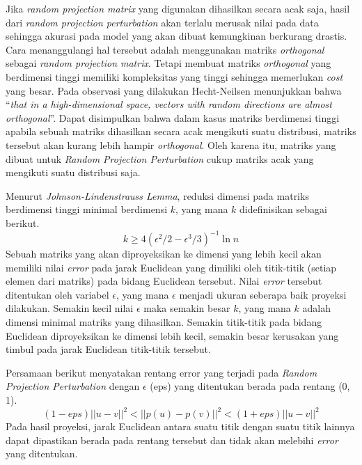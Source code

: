 \documentclass[a4paper,twoside]{article}
\begin{document}
\begin{enumerate}
		Jika \textit{random projection matrix} yang digunakan dihasilkan secara acak saja, hasil dari \textit{random projection perturbation} akan terlalu merusak nilai pada data sehingga akurasi pada model yang akan dibuat kemungkinan berkurang drastis. Cara menanggulangi hal tersebut adalah menggunakan matriks \textit{orthogonal} sebagai \textit{random projection matrix}. Tetapi membuat matriks \textit{orthogonal} yang berdimensi tinggi memiliki kompleksitas yang tinggi sehingga memerlukan \textit{cost} yang besar. Pada observasi yang dilakukan Hecht-Neilsen menunjukkan bahwa “\textit{that in a high-dimensional space, vectors with random directions are almost orthogonal}”. Dapat disimpulkan bahwa dalam kasus matriks berdimensi tinggi apabila sebuah matriks dihasilkan secara acak mengikuti suatu distribusi, matriks tersebut akan kurang lebih hampir \textit{orthogonal}. Oleh karena itu, matriks yang dibuat untuk \textit{Random Projection Perturbation} cukup matriks acak yang mengikuti suatu distribusi saja.
		
		Menurut \textit{Johnson-Lindenstrauss Lemma}, reduksi dimensi pada matriks berdimensi tinggi minimal berdimensi \(k\), yang mana \(k\) didefinisikan sebagai berikut.
		\begin{equation}
			k \geq 4(\epsilon^{2}/2-\epsilon^{3}/3)^{-1}\ln{n}
		\end{equation}
		Sebuah matriks yang akan diproyeksikan ke dimensi yang lebih kecil akan memiliki nilai \textit{error} pada jarak Euclidean yang dimiliki oleh titik-titik (setiap elemen dari matriks) pada bidang Euclidean tersebut. Nilai \textit{error} tersebut ditentukan oleh variabel \(\epsilon\), yang mana \(\epsilon\) menjadi ukuran seberapa baik proyeksi dilakukan. Semakin kecil nilai \(\epsilon\) maka semakin besar \(k\), yang mana \(k\) adalah dimensi minimal matriks yang dihasilkan. Semakin titik-titik pada bidang Euclidean diproyeksikan ke dimensi lebih kecil, semakin besar kerusakan yang timbul pada jarak Euclidean titik-titik tersebut.
		
		Persamaan berikut menyatakan rentang error yang terjadi pada \textit{Random Projection Perturbation} dengan \(\epsilon\) (eps) yang ditentukan berada pada rentang (0, 1). 
		\begin{equation}
			(1-eps)||u - v||^{2}<||p(u) - p(v)||^{2}<(1+eps)||u - v||^{2}
		\end{equation}
		Pada hasil proyeksi, jarak Euclidean antara suatu titik dengan suatu titik lainnya dapat dipastikan berada pada rentang tersebut dan tidak akan melebihi \textit{error} yang ditentukan.		


\end{enumerate}
\end{document}
